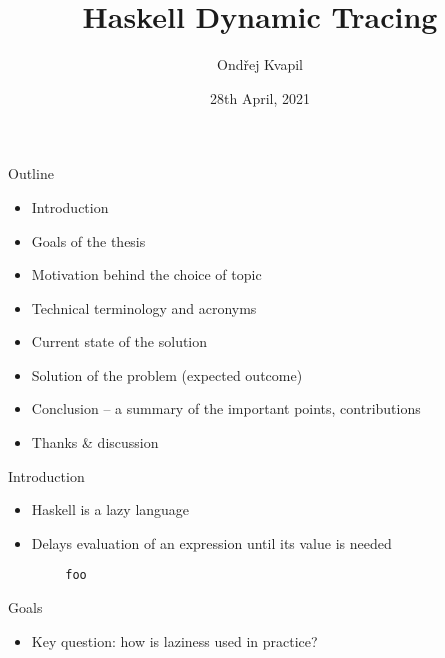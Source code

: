 \documentclass[aspectratio=169]{beamer}
\title{Haskell Dynamic Tracing}
\author{Ondřej Kvapil}
\institute{Faculty of information technology, Czech technical university in Prague}
\date{28th April, 2021}
\begin{document}
\begin{center}
	\maketitle
\end{center}

\begin{frame}{Outline}
	\begin{itemize}
		\item Introduction
		\item Goals of the thesis
		\item Motivation behind the choice of topic
		\item Technical terminology and acronyms
		\item Current state of the solution
		\item Solution of the problem (expected outcome)
		\item Conclusion -- a summary of the important points, contributions
		\item Thanks \& discussion
	\end{itemize}
\end{frame}

\begin{frame}{Introduction}
	\begin{itemize}
		\item Haskell is a \alert{lazy} language \pause
		\item Delays evaluation of an expression until its value is needed
	\end{itemize}
	\begin{verbatim}
		foo
	\end{verbatim}
\end{frame}

\begin{frame}{Goals}
	\begin{itemize}
		\item Key question: how is laziness used in practice?
	\end{itemize}
\end{frame}
\end{document}
